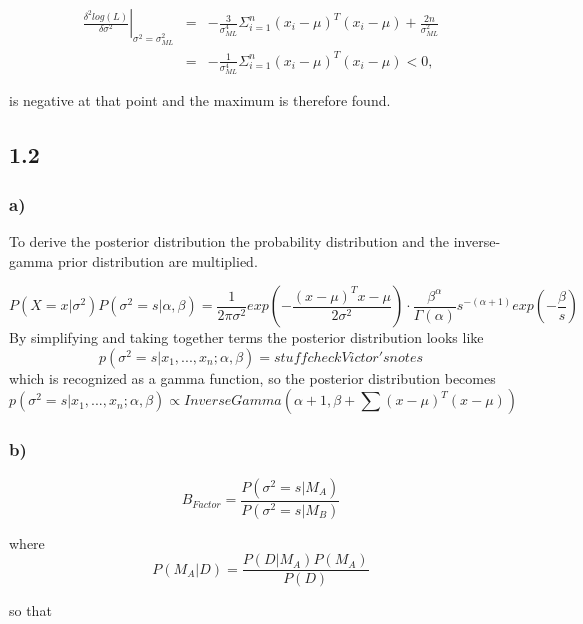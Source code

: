 \documentclass{article}
\begin{document}
\begin{equation}
\begin{array}{rcl}
\left.\frac{\delta^2 log(L)}{\delta\sigma^2}\right|_{\sigma^2=\sigma_{ML}^2} & = & -\frac{3}{\sigma^4_{ML}}\Sigma_{i=1}^{n}(x_i-\mu)^T(x_i-\mu)+\frac{2n}{\sigma^2_{ML}}\\
& = & -\frac{1}{\sigma^4_{ML}}\Sigma_{i=1}^{n}(x_i-\mu)^T(x_i-\mu) < 0,
\end{array}
\end{equation}

is negative at that point and the maximum is therefore found.

\subsection*{1.2}

\subsubsection*{a)}
To derive the posterior distribution the probability distribution and the inverse-gamma prior distribution are multiplied. 

$$ P(X =x|\sigma^2) P(\sigma^2=s|\alpha , \beta) = \frac{1}{2\pi \sigma^2} exp(-\frac{(x - \mu)^Tx-\mu}{2\sigma^2})\cdot \frac{\beta^{\alpha}}{\Gamma(\alpha)}s^{-(\alpha+1)}exp(-\frac{\beta}{s}) $$
\noindent By simplifying and taking together terms the posterior distribution looks like
$$p(\sigma^2 = s|x_1,...,x_n;\alpha,\beta) = stuff check Victor's notes $$
\noindent which is recognized as a gamma function, so the posterior distribution becomes
\begin{equation}
p(\sigma^2=s|x_1,...,x_n;\alpha,\beta) \propto InverseGamma(\alpha+1, \beta + \sum(x-\mu)^{T}(x-\mu))
\end{equation}

\subsubsection*{b)}

\begin{equation}
B_{Factor}=\frac{P(\sigma^2=s|M_A)}{P(\sigma^2=s|M_B)}
\end{equation}

where
\begin{equation}
P(M_A|D)=\frac{P(D|M_A)P(M_A)}{P(D)}
\end{equation}

so that
\end{document}
